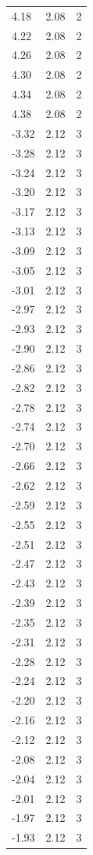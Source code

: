 \begin{longtable}{lrr}
  4.18 & 2.08 & 2 \\
  4.22 & 2.08 & 2 \\
  4.26 & 2.08 & 2 \\
  4.30 & 2.08 & 2 \\
  4.34 & 2.08 & 2 \\
  4.38 & 2.08 & 2 \\
  -3.32 & 2.12 & 3 \\
  -3.28 & 2.12 & 3 \\
  -3.24 & 2.12 & 3 \\
  -3.20 & 2.12 & 3 \\
  -3.17 & 2.12 & 3 \\
  -3.13 & 2.12 & 3 \\
  -3.09 & 2.12 & 3 \\
  -3.05 & 2.12 & 3 \\
  -3.01 & 2.12 & 3 \\
  -2.97 & 2.12 & 3 \\
  -2.93 & 2.12 & 3 \\
  -2.90 & 2.12 & 3 \\
  -2.86 & 2.12 & 3 \\
  -2.82 & 2.12 & 3 \\
  -2.78 & 2.12 & 3 \\
  -2.74 & 2.12 & 3 \\
  -2.70 & 2.12 & 3 \\
  -2.66 & 2.12 & 3 \\
  -2.62 & 2.12 & 3 \\
  -2.59 & 2.12 & 3 \\
  -2.55 & 2.12 & 3 \\
  -2.51 & 2.12 & 3 \\
  -2.47 & 2.12 & 3 \\
  -2.43 & 2.12 & 3 \\
  -2.39 & 2.12 & 3 \\
  -2.35 & 2.12 & 3 \\
  -2.31 & 2.12 & 3 \\
  -2.28 & 2.12 & 3 \\
  -2.24 & 2.12 & 3 \\
  -2.20 & 2.12 & 3 \\
  -2.16 & 2.12 & 3 \\
  -2.12 & 2.12 & 3 \\
  -2.08 & 2.12 & 3 \\
  -2.04 & 2.12 & 3 \\
  -2.01 & 2.12 & 3 \\
  -1.97 & 2.12 & 3 \\
  -1.93 & 2.12 & 3 \\

\end{longtable}
